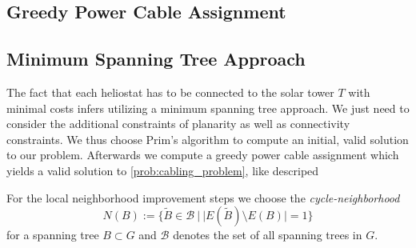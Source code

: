 \subsection{Greedy Power Cable Assignment}\label{sec:assign_power}

\subsection{Minimum Spanning Tree Approach}\label{sec:mst}
The fact that each heliostat has to be connected to the solar tower $T$ with minimal costs infers utilizing a minimum spanning tree approach. We just need to consider the additional constraints of planarity as well as connectivity constraints. We thus choose Prim's algorithm \cite{prim_1957,cormen_2009} to compute an initial, valid solution to our problem. Afterwards we compute a greedy power cable assignment which yields a valid solution to \cref{prob:cabling_problem}, like descriped

\noindent
For the local neighborhood improvement steps we choose the \emph{cycle-neighborhood}
\begin{equation*}
  N(B) := \{\tilde{B}\in\mathcal{B}\ |\ |E(\tilde{B})\setminus E(B)| = 1 \}
\end{equation*}
for a spanning tree $B\subset G$ and $\mathcal{B}$ denotes the set of all spanning trees in $G$.

